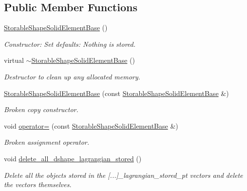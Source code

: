 \subsection*{Public Member Functions}
\begin{DoxyCompactItemize}
\item 
\hyperlink{classoomph_1_1StorableShapeSolidElementBase_a9e4afdd429dbaa37a9b20422250bc368}{Storable\+Shape\+Solid\+Element\+Base} ()
\begin{DoxyCompactList}\small\item\em Constructor\+: Set defaults\+: Nothing is stored. \end{DoxyCompactList}\item 
virtual \hyperlink{classoomph_1_1StorableShapeSolidElementBase_a30f3e2a847663a6ef4338b4a3770554a}{$\sim$\+Storable\+Shape\+Solid\+Element\+Base} ()
\begin{DoxyCompactList}\small\item\em Destructor to clean up any allocated memory. \end{DoxyCompactList}\item 
\hyperlink{classoomph_1_1StorableShapeSolidElementBase_a4fc88feb5411e582a2640268ec733ad7}{Storable\+Shape\+Solid\+Element\+Base} (const \hyperlink{classoomph_1_1StorableShapeSolidElementBase}{Storable\+Shape\+Solid\+Element\+Base} \&)
\begin{DoxyCompactList}\small\item\em Broken copy constructor. \end{DoxyCompactList}\item 
void \hyperlink{classoomph_1_1StorableShapeSolidElementBase_a39120d36ee55497f58f4d31aebe2f0c9}{operator=} (const \hyperlink{classoomph_1_1StorableShapeSolidElementBase}{Storable\+Shape\+Solid\+Element\+Base} \&)
\begin{DoxyCompactList}\small\item\em Broken assignment operator. \end{DoxyCompactList}\item 
void \hyperlink{classoomph_1_1StorableShapeSolidElementBase_ad5854362861320a83be19c6a5eebe3a5}{delete\+\_\+all\+\_\+dshape\+\_\+lagrangian\+\_\+stored} ()
\begin{DoxyCompactList}\small\item\em Delete all the objects stored in the \mbox{[}...\mbox{]}\+\_\+lagrangian\+\_\+stored\+\_\+pt vectors and delete the vectors themselves. \end{DoxyCompactList}\item 

\end{DoxyCompactItemize}
